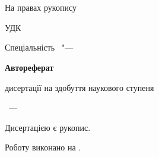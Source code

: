 \thispagestyle{empty}
\begin{center}%
	\thesisOrganizationDone\\
	\thesisOrganizationMinistryDone\\
\end{center}%

\vspace{0pt plus1fill}
\begin{flushright}
	На правах рукопису
\end{flushright}

\vspace{0pt plus0.25fill}
\begin{center}%
\textbf{\MakeUppercase{\thesisAuthor}}
\end{center}%


\vspace{0pt plus0.25fill}
\begin{flushright}%
	УДК \thesisUdk
\end{flushright}%



\vspace{0pt plus2fill} %
\begin{center}
\textbf{\MakeUppercase{\thesisTitle}}

\vspace{0pt plus2fill}
Спеціальність \thesisSpecialtyNumber\ "--- \thesisSpecialtyTitle

\vspace{0pt plus2fill}
\textbf{Автореферат}

дисертації на здобуття наукового ступеня

\thesisDegree
\end{center}

\vspace{0pt plus6fill} %
{\centering\thesisCity~--- \thesisYear\par}

\newpage
\thispagestyle{empty}
Дисертацією є рукопис.

Роботу виконано  на {\thesisInOrganization}.

